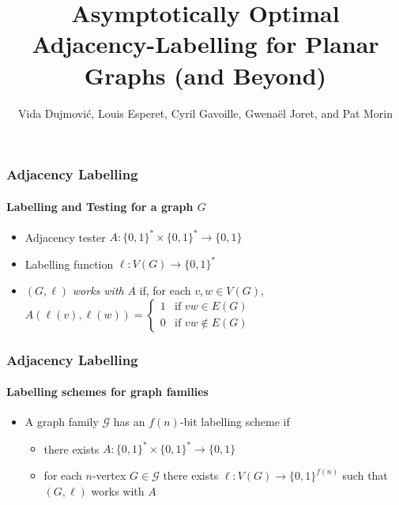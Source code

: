\documentclass[aspectratio=169,xcolor=dvipsnames]{beamer}
\title[Adjacency Labelling]{Asymptotically Optimal Adjacency-Labelling for Planar Graphs\newline
 (and Beyond)}
\author[Dujmović, Esperet, Gavoille, Joret, Morin]{Vida Dujmović, Louis Esperet, Cyril Gavoille, Gwenaël Joret, and Pat Morin}
\begin{document}
\begin{frame}
  \titlepage
\end{frame}

\begin{frame}
  \frametitle{Adjacency Labelling}
  \framesubtitle{Labelling and Testing for a graph $G$}

  \begin{itemize}
    \item Adjacency tester $A:\{0,1\}^*\times\{0,1\}^*\to \{0,1\}$
    \item Labelling function $\ell:V(G)\to\{0,1\}^*$
    \item $(G,\ell)$ \emph{works with} $A$ if, for each $v,w\in V(G)$,
        $
            A(\ell(v),\ell(w)) = \begin{cases}
                1 & \text{if $vw\in E(G)$} \\
                0 & \text{if $vw\not\in E(G)$}
        \end{cases}
        $
    \end{itemize}
    \begin{center}
    \end{center}
\end{frame}

\begin{frame}
    \frametitle{Adjacency Labelling}
    \framesubtitle{Labelling schemes for graph families}

    \begin{itemize}
        \item<+->A graph family $\mathcal{G}$ has an $f(n)$-bit labelling scheme if \begin{itemize}
            \item there exists $A:\{0,1\}^*\times\{0,1\}^*\to\{0,1\}$
            \item for each $n$-vertex $G\in\mathcal{G}$ there exists $\ell:V(G)\to\{0,1\}^{f(n)}$ such that $(G,\ell)$ works with $A$
        \end{itemize}
    \end{itemize}
    \begin{center}
    \end{center}
\end{frame}
\end{document}
